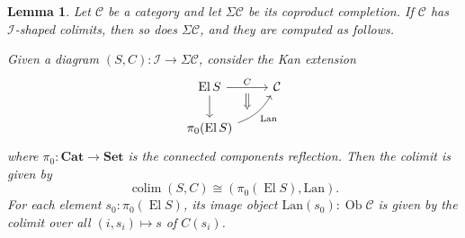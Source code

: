 \documentclass[11pt, one side, article]{memoir}
\theoremstyle{definition}
\theoremstyle{plain}
\newtheorem{lemma}[definitionx]{Lemma}
\DeclareMathOperator*{\colim}{colim}
\DeclareMathOperator{\ob}{Ob}
\DeclareMathOperator{\el}{El}
\newcommand{\cat}[1]{\mathcal{#1}}%
\newcommand{\Cat}[1]{\mathbf{#1}}%
\newcommand{\fun}[1]{\mathrm{#1}}%
\newcommand{\smset}{\Cat{Set}}
\newcommand{\smcat}{\Cat{Cat}}
\begin{document}
\begin{lemma}\label{lemma.coprod_comp_colimits}
Let $\cat{C}$ be a category and let $\Sigma\cat{C}$ be its coproduct completion. If $\cat{C}$ has $\cat{I}$-shaped colimits, then so does $\Sigma\cat{C}$, and they are computed as follows.

Given a diagram $(S,C)\colon\cat{I}\to\Sigma\cat{C}$, consider the Kan extension
\[
\begin{tikzcd}
	\el S\ar[r, "C", ""' name=C]\ar[d]&
	\cat{C}\\
	\pi_0(\el S)\ar[ur, bend right=20pt, "\fun{Lan}"', "" name=colim]
	\ar[from=C, to=C|-colim, Rightarrow]
\end{tikzcd}
\]
where $\pi_0\colon\smcat\to\smset$ is the connected components reflection. Then the colimit is given by
\begin{equation}\label{eqn.colim_pi0_lan}
\colim(S,C)\cong(\pi_0(\el S),\fun{Lan}).
\end{equation}
For each element $s_0:\pi_0(\el S)$, its image object $\fun{Lan}(s_0):\ob\cat{C}$ is given by the colimit over all $(i,s_i)\mapsto s$ of $C(s_i)$.
\end{lemma}
\end{document}
